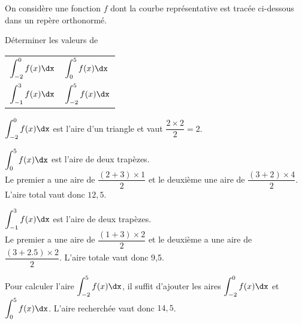 \documentclass[11pt,fleqn, openany]{book} %
\begin{document}
\begin{exercise}[topic=int01]
On considère une fonction $f$ dont la courbe représentative est tracée ci-dessous dans un repère orthonormé.

\begin{minipage}{0.55\linewidth}
Déterminer les valeurs de 
\vskip10pt
\renewcommand{\arraystretch}{2.5}
\begin{tabularx}{\linewidth}{XX}$\displaystyle\int_{-2}^0f(x)\dx$ & $\displaystyle\int_{0}^5f(x)\dx$ \\ $\displaystyle\int_{-1}^3f(x)\dx$ & $\displaystyle\int_{-2}^5f(x)\dx$\end{tabularx}

\end{minipage}\hfill\begin{minipage}{0.4\linewidth}
\end{minipage}


\end{exercise}

\begin{solution}
 \(\displaystyle\int_{-2}^0f(x)\dx\) est l'aire d'un triangle et vaut \(\dfrac{2 \times 2}{2}=2\).

 \(\displaystyle\int_{0}^5f(x)\dx\) est l'aire de deux trapèzes. \\Le premier a une aire de \(\dfrac{(2+3)\times 1}{2}\) et le deuxième une aire de \(\dfrac{(3+2)\times 4}{2}\). L'aire total vaut donc \(12,5\).


 \(\displaystyle\int_{-1}^3f(x)\dx\) est l'aire de deux trapèzes. \\Le premier a une aire de \(\dfrac{(1+3) \times 2}{2}\) et le deuxième a une aire de \(\dfrac{(3+2.5)\times 2}{2}\). L'aire totale vaut donc 9,5.

 Pour calculer l'aire \(\displaystyle\int_{-2}^5f(x)\dx\), il suffit d'ajouter les aires \(\displaystyle\int_{-2}^0f(x)\dx\) et \(\displaystyle\int_{0}^5f(x)\dx\). L'aire recherchée vaut donc \(14,5\).\end{solution}
\end{document}
